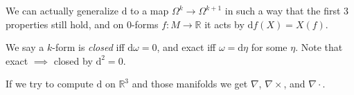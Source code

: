 We can actually generalize $\mathrm{d} $ to a map $\Omega ^k\to \Omega ^{k+1} $ in such a way that the first 3 properties still hold, and on $0$-forms $f : M \to \mathbb{R} $ it acts by $\mathrm{d} f(X)=X(f)$.

\begin{definition}\label{sljnd}
	We say a $k$-form is \emph{closed} iff $\mathrm{d} \omega =0$, and exact iff $\omega =\mathrm{d} \eta $ for some $\eta $. Note that exact $\implies $ closed by $\mathrm{d} ^2=0$.
\end{definition}

\begin{example}
	If we try to compute $\mathrm{d} $ on $\mathbb{R} ^3$ and those manifolds we get $\nabla $, $\nabla \times $, and $\nabla \cdot $.
\end{example}

